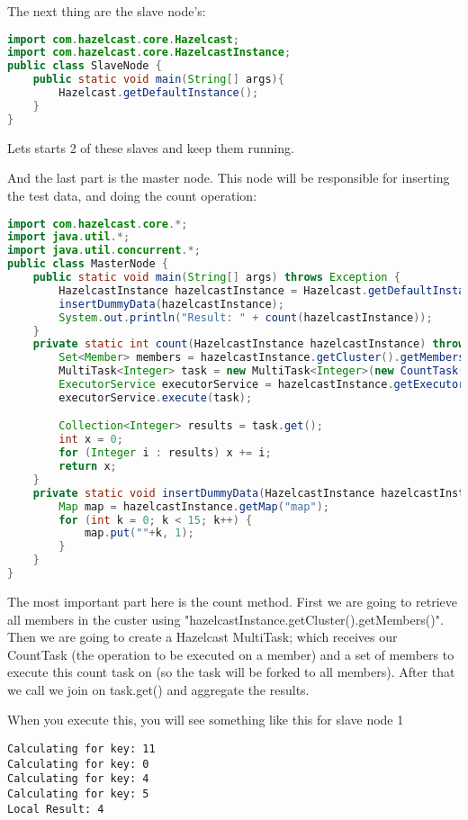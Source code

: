 The next thing are the slave node's:
\begin{lstlisting}[language=java]
import com.hazelcast.core.Hazelcast;
import com.hazelcast.core.HazelcastInstance;
public class SlaveNode {
    public static void main(String[] args){
        Hazelcast.getDefaultInstance();
    }
}
\end{lstlisting}
Lets starts 2 of these slaves and keep them running.

And the last part is the master node. This node will be responsible for inserting the test data, and doing the count operation:

\begin{lstlisting}[language=java]
import com.hazelcast.core.*;
import java.util.*;
import java.util.concurrent.*;
public class MasterNode {
    public static void main(String[] args) throws Exception {
        HazelcastInstance hazelcastInstance = Hazelcast.getDefaultInstance();
        insertDummyData(hazelcastInstance);
        System.out.println("Result: " + count(hazelcastInstance));
    }
    private static int count(HazelcastInstance hazelcastInstance) throws Exception {
        Set<Member> members = hazelcastInstance.getCluster().getMembers();
        MultiTask<Integer> task = new MultiTask<Integer>(new CountTask(), members);
        ExecutorService executorService = hazelcastInstance.getExecutorService();
        executorService.execute(task);

        Collection<Integer> results = task.get();
        int x = 0;
        for (Integer i : results) x += i;
        return x;
    }
    private static void insertDummyData(HazelcastInstance hazelcastInstance) {
        Map map = hazelcastInstance.getMap("map");
        for (int k = 0; k < 15; k++) {
            map.put(""+k, 1);
        }
    }
}
\end{lstlisting}
The most important part here is the count method. First we are going to retrieve all members in the custer using "hazelcastInstance.getCluster().getMembers()". Then we are going to create a Hazelcast MultiTask; which receives our CountTask (the operation to be executed on a member) and a set of members to execute this count task on (so the task will be forked to all members). After that we call we join on task.get() and aggregate the results.

When you execute this, you will see something like this for slave node 1
\begin{verbatim}
Calculating for key: 11
Calculating for key: 0
Calculating for key: 4
Calculating for key: 5
Local Result: 4
\end{verbatim}

